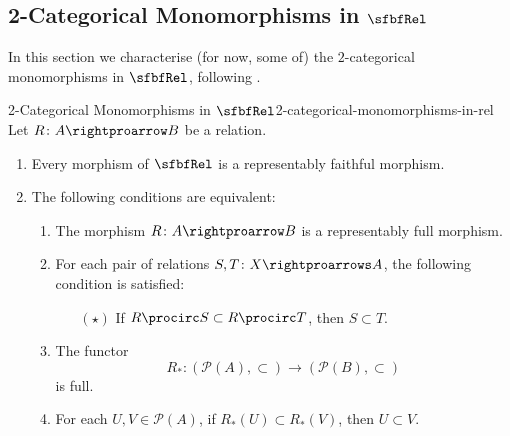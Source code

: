 \subsection{2-Categorical Monomorphisms in $\sfbfRel$}\label{subsection-2-categorical-monomorphism-in-rel}
In this section we characterise (for now, some of) the $2$-categorical monomorphisms in $\sfbfRel$, following .
\begin{proposition}{2-Categorical Monomorphisms in $\sfbfRel$}{2-categorical-monomorphisms-in-rel}%
    Let $R\colon A\rightproarrow B$ be a relation.
    \begin{enumerate}
        \item\label{2-categorical-monomorphisms-in-rel-representably-faithful-morphisms-in-rel}Every morphism of $\sfbfRel$ is a representably faithful morphism.
        \item\label{2-categorical-monomorphisms-in-rel-representably-full-morphisms-in-rel}The following conditions are equivalent:
            \begin{enumerate}
                \item\label{2-categorical-monomorphisms-in-rel-representably-full-morphisms-in-rel-1}The morphism $R\colon A\rightproarrow B$ is a representably full morphism.
                \item\label{2-categorical-monomorphisms-in-rel-representably-full-morphisms-in-rel-2}For each pair of relations $S,T\colon X\rightproarrows A$, the following condition is satisfied:
                    \begin{itemize}%
                        \item[$(\star)$]If $R\procirc S\subset R\procirc T$, then $S\subset T$.
                    \end{itemize}%
                \item\label{2-categorical-monomorphisms-in-rel-representably-full-morphisms-in-rel-3}The functor
                    \[
                        R_{*}%
                        \colon%
                        (\mathcal{P}(A),\subset)%
                        \to%
                        (\mathcal{P}(B),\subset)%
                    \]%
                    is full.
                \item\label{2-categorical-monomorphisms-in-rel-representably-full-morphisms-in-rel-4}For each $U,V\in\mathcal{P}(A)$, if $R_{*}(U)\subset R_{*}(V)$, then $U\subset V$.

\end{enumerate}
\end{enumerate}
\end{proposition}
